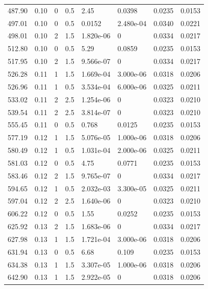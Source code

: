 \documentclass[preview]{standalone}
\begin{document}
{{{\begin{tabular}{L{1.2cm}C{1.2cm} C{0.3cm}C{0.5cm} C{1.4cm}C{1.4cm} C{1.4cm}C{1.4cm}}
  487.90  &  0.10  & 0     & 0.5 &  2.45  & 0.0398  & 0.0235 &  0.0153   \\ 
  497.01  &  0.10  & 0     & 0.5 &  0.0152  & 2.480e-04  & 0.0340 &  0.0221   \\ 
  498.01  &  0.10  & 2     & 1.5 &  1.820e-06  & 0  & 0.0334 &  0.0217   \\ 
  512.80  &  0.10  & 0     & 0.5 &  5.29  & 0.0859  & 0.0235 &  0.0153   \\ 
  517.95  &  0.10  & 2     & 1.5 &  9.566e-07  & 0  & 0.0334 &  0.0217   \\ 
  526.28  &  0.11  & 1     & 1.5 &  1.669e-04  & 3.000e-06  & 0.0318 &  0.0206   \\ 
  526.96  &  0.11  & 1     & 0.5 &  3.534e-04  & 6.000e-06  & 0.0325 &  0.0211   \\ 
  533.02  &  0.11  & 2     & 2.5 &  1.254e-06  & 0  & 0.0323 &  0.0210   \\ 
  539.54  &  0.11  & 2     & 2.5 &  3.814e-07  & 0  & 0.0323 &  0.0210   \\ 
  555.45  &  0.11  & 0     & 0.5 &  0.768  & 0.0125  & 0.0235 &  0.0153   \\ 
  577.19  &  0.12  & 1     & 1.5 &  5.076e-05  & 1.000e-06  & 0.0318 &  0.0206   \\ 
  580.49  &  0.12  & 1     & 0.5 &  1.031e-04  & 2.000e-06  & 0.0325 &  0.0211   \\ 
  581.03  &  0.12  & 0     & 0.5 &  4.75  & 0.0771  & 0.0235 &  0.0153   \\ 
  583.46  &  0.12  & 2     & 1.5 &  9.765e-07  & 0  & 0.0334 &  0.0217   \\ 
  594.65  &  0.12  & 1     & 0.5 &  2.032e-03  & 3.300e-05  & 0.0325 &  0.0211   \\ 
  597.04  &  0.12  & 2     & 2.5 &  1.640e-06  & 0  & 0.0323 &  0.0210   \\ 
  606.22  &  0.12  & 0     & 0.5 &  1.55  & 0.0252  & 0.0235 &  0.0153   \\ 
  625.92  &  0.13  & 2     & 1.5 &  1.683e-06  & 0  & 0.0334 &  0.0217   \\ 
  627.98  &  0.13  & 1     & 1.5 &  1.721e-04  & 3.000e-06  & 0.0318 &  0.0206   \\ 
  631.94  &  0.13  & 0     & 0.5 &  6.68  & 0.109  & 0.0235 &  0.0153   \\ 
  634.38  &  0.13  & 1     & 1.5 &  3.307e-05  & 1.000e-06  & 0.0318 &  0.0206   \\ 
  642.90  &  0.13  & 1     & 1.5 &  2.922e-05  & 0  & 0.0318 &  0.0206   \\ 

\end{tabular}}}}
\end{document}
